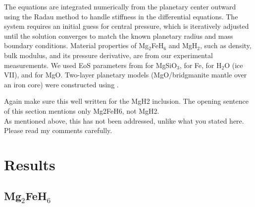 \documentclass[draft,jgrga,12pt]{agujournal2019}
\begin{document}
The equations are integrated numerically from the planetary center outward using the Radau method \cite{butcher_coefficients_1963} to handle stiffness in the differential equations. 
The system requires an initial guess for central pressure, which is iteratively adjusted until the solution converges to match the known planetary radius and mass boundary conditions. 
Material properties of Mg$_2$FeH$_6$ and MgH$_2$, such as density, bulk modulus, and its pressure derivative, are from our experimental measurements.
We used EoS parameters from  for MgSiO$_3$,  for Fe,  for H$_2$O (ice VII), and  for MgO. Two-layer planetary models (MgO/bridgmanite mantle over an iron core) were constructed using  \cite{myhill_burnman_2023}.
\begin{cbox}
Again make sure this well written for the MgH2 inclusion.  The opening sentence of this section mentions only Mg2FeH6, not MgH2. 
\\
As mentioned above, this has not been addressed, unlike what you stated here. Please read my comments carefully.\XWrevised
\end{cbox}


\section{Results}
\subsection{Mg$_2$FeH$_6$}
\end{document}
